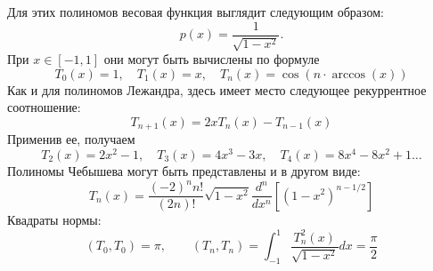 \documentclass[../../calc-math-exam-2023.tex]{subfiles}
\begin{document}
\begin{enumerate}
        Для этих полиномов весовая функция выглядит следующим образом:
        \begin{equation*}
            p(x) = \frac{1}{\sqrt{1-x^2}}.
        \end{equation*}
        При $x \in [-1, 1]$ они могут быть вычислены по формуле
        \begin{equation}
            T_0(x) = 1, \quad T_1(x) = x, \quad T_n(x) = \cos \left( n \cdot \arccos(x) \right) \label{eq:chebyshev}
        \end{equation}
        Как и для полиномов Лежандра, здесь имеет место следующее рекуррентное соотношение:
        \begin{equation*}
            T_{n+1}(x) = 2xT_n(x) - T_{n-1}(x)
        \end{equation*}
        Применив ее, получаем
        \begin{equation*}
            T_2(x) = 2x^2 - 1, \quad T_3(x) = 4x^3 -3x, \quad T_4(x) = 8x^4 -8x^2 + 1\dots
        \end{equation*}
        Полиномы Чебышева могут быть представлены и в другом виде:
        \begin{equation}
            T_n(x) = \frac{(-2)^n n!}{(2n)!}\sqrt{1-x^2}\frac{d^n}{dx^n}\left[ \left( 1 - x^2 \right)^{n-1/2} \right] \label{eq:chebyshev2}
        \end{equation}
        Квадраты нормы:
        \begin{equation*}
        (T_0, T_0) = \pi, \qquad (T_n, T_n) = \int_{-1}^{1} \frac{T_n^2(x)}{\sqrt{1-x^2}}dx = \frac{\pi}{2}
        \end{equation*}
    \end{enumerate}
\end{document}
